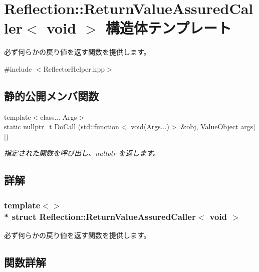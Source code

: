 \hypertarget{struct_reflection_1_1_return_value_assured_caller_3_01void_01_4}{}\section{Reflection\+:\+:Return\+Value\+Assured\+Caller$<$ void $>$ 構造体テンプレート}
\label{struct_reflection_1_1_return_value_assured_caller_3_01void_01_4}


必ず何らかの戻り値を返す関数を提供します。 




{\ttfamily \#include $<$Reflector\+Helper.\+hpp$>$}

\subsection*{静的公開メンバ関数}
\begin{DoxyCompactItemize}
\item 
{\footnotesize template$<$class... Args$>$ }\\static nullptr\+\_\+t \hyperlink{struct_reflection_1_1_return_value_assured_caller_3_01void_01_4_aa5b216a5a1d90fa01f487aeac12077d1}{Do\+Call} (\hyperlink{classstd_1_1function}{std\+::function}$<$ void(Args...)$>$ \&obj, \hyperlink{struct_reflection_1_1_value_object}{Value\+Object} args\mbox{[}$\,$\mbox{]})
\begin{DoxyCompactList}\small\item\em 指定された関数を呼び出し、nullptr を返します。\end{DoxyCompactList}\end{DoxyCompactItemize}


\subsection{詳解}
\subsubsection*{template$<$$>$\\*
struct Reflection\+::\+Return\+Value\+Assured\+Caller$<$ void $>$}

必ず何らかの戻り値を返す関数を提供します。



\subsection{関数詳解}
